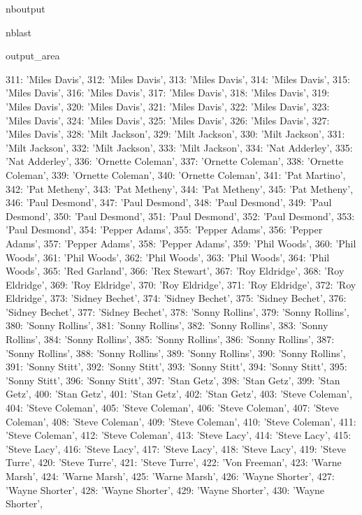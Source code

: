 \documentclass[letterpaper,10pt,english]{sphinxmanual}
\begin{document}
\begin{sphinxuseclass}{nboutput}
\begin{sphinxuseclass}{nblast}
{\begin{sphinxuseclass}{output_area}
\begin{sphinxuseclass}{}
\begin{sphinxVerbatim}[commandchars=\\\{\}]
 311: 'Miles Davis',
 312: 'Miles Davis',
 313: 'Miles Davis',
 314: 'Miles Davis',
 315: 'Miles Davis',
 316: 'Miles Davis',
 317: 'Miles Davis',
 318: 'Miles Davis',
 319: 'Miles Davis',
 320: 'Miles Davis',
 321: 'Miles Davis',
 322: 'Miles Davis',
 323: 'Miles Davis',
 324: 'Miles Davis',
 325: 'Miles Davis',
 326: 'Miles Davis',
 327: 'Miles Davis',
 328: 'Milt Jackson',
 329: 'Milt Jackson',
 330: 'Milt Jackson',
 331: 'Milt Jackson',
 332: 'Milt Jackson',
 333: 'Milt Jackson',
 334: 'Nat Adderley',
 335: 'Nat Adderley',
 336: 'Ornette Coleman',
 337: 'Ornette Coleman',
 338: 'Ornette Coleman',
 339: 'Ornette Coleman',
 340: 'Ornette Coleman',
 341: 'Pat Martino',
 342: 'Pat Metheny',
 343: 'Pat Metheny',
 344: 'Pat Metheny',
 345: 'Pat Metheny',
 346: 'Paul Desmond',
 347: 'Paul Desmond',
 348: 'Paul Desmond',
 349: 'Paul Desmond',
 350: 'Paul Desmond',
 351: 'Paul Desmond',
 352: 'Paul Desmond',
 353: 'Paul Desmond',
 354: 'Pepper Adams',
 355: 'Pepper Adams',
 356: 'Pepper Adams',
 357: 'Pepper Adams',
 358: 'Pepper Adams',
 359: 'Phil Woods',
 360: 'Phil Woods',
 361: 'Phil Woods',
 362: 'Phil Woods',
 363: 'Phil Woods',
 364: 'Phil Woods',
 365: 'Red Garland',
 366: 'Rex Stewart',
 367: 'Roy Eldridge',
 368: 'Roy Eldridge',
 369: 'Roy Eldridge',
 370: 'Roy Eldridge',
 371: 'Roy Eldridge',
 372: 'Roy Eldridge',
 373: 'Sidney Bechet',
 374: 'Sidney Bechet',
 375: 'Sidney Bechet',
 376: 'Sidney Bechet',
 377: 'Sidney Bechet',
 378: 'Sonny Rollins',
 379: 'Sonny Rollins',
 380: 'Sonny Rollins',
 381: 'Sonny Rollins',
 382: 'Sonny Rollins',
 383: 'Sonny Rollins',
 384: 'Sonny Rollins',
 385: 'Sonny Rollins',
 386: 'Sonny Rollins',
 387: 'Sonny Rollins',
 388: 'Sonny Rollins',
 389: 'Sonny Rollins',
 390: 'Sonny Rollins',
 391: 'Sonny Stitt',
 392: 'Sonny Stitt',
 393: 'Sonny Stitt',
 394: 'Sonny Stitt',
 395: 'Sonny Stitt',
 396: 'Sonny Stitt',
 397: 'Stan Getz',
 398: 'Stan Getz',
 399: 'Stan Getz',
 400: 'Stan Getz',
 401: 'Stan Getz',
 402: 'Stan Getz',
 403: 'Steve Coleman',
 404: 'Steve Coleman',
 405: 'Steve Coleman',
 406: 'Steve Coleman',
 407: 'Steve Coleman',
 408: 'Steve Coleman',
 409: 'Steve Coleman',
 410: 'Steve Coleman',
 411: 'Steve Coleman',
 412: 'Steve Coleman',
 413: 'Steve Lacy',
 414: 'Steve Lacy',
 415: 'Steve Lacy',
 416: 'Steve Lacy',
 417: 'Steve Lacy',
 418: 'Steve Lacy',
 419: 'Steve Turre',
 420: 'Steve Turre',
 421: 'Steve Turre',
 422: 'Von Freeman',
 423: 'Warne Marsh',
 424: 'Warne Marsh',
 425: 'Warne Marsh',
 426: 'Wayne Shorter',
 427: 'Wayne Shorter',
 428: 'Wayne Shorter',
 429: 'Wayne Shorter',
 430: 'Wayne Shorter',

\end{sphinxVerbatim}
\end{sphinxuseclass}
\end{sphinxuseclass}}
\end{sphinxuseclass}
\end{sphinxuseclass}
\end{document}
